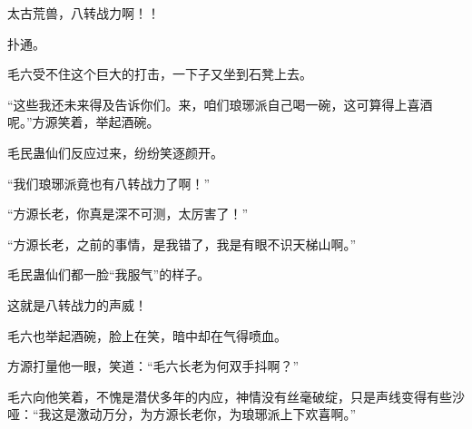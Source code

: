 \begin{this_body}
太古荒兽，八转战力啊！！

扑通。

毛六受不住这个巨大的打击，一下子又坐到石凳上去。

“这些我还未来得及告诉你们。来，咱们琅琊派自己喝一碗，这可算得上喜酒呢。”方源笑着，举起酒碗。

毛民蛊仙们反应过来，纷纷笑逐颜开。

“我们琅琊派竟也有八转战力了啊！”

“方源长老，你真是深不可测，太厉害了！”

“方源长老，之前的事情，是我错了，我是有眼不识天梯山啊。”

毛民蛊仙们都一脸“我服气”的样子。

这就是八转战力的声威！

毛六也举起酒碗，脸上在笑，暗中却在气得喷血。

方源打量他一眼，笑道：“毛六长老为何双手抖啊？”

毛六向他笑着，不愧是潜伏多年的内应，神情没有丝毫破绽，只是声线变得有些沙哑：“我这是激动万分，为方源长老你，为琅琊派上下欢喜啊。”

\end{this_body}

